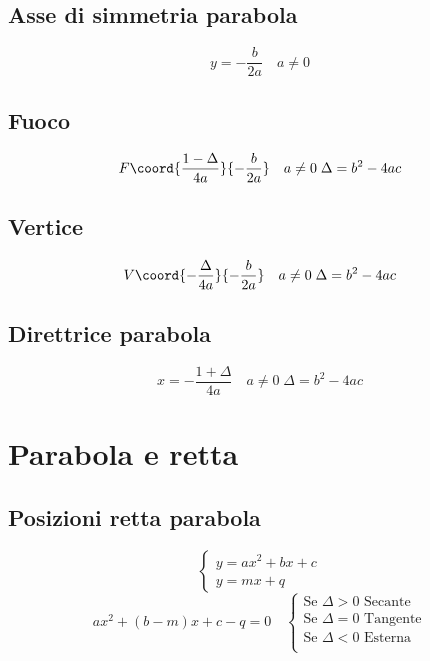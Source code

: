 \section{Asse di simmetria parabola}
\begin{equation}
y=-\dfrac{b}{2a}\quad a\neq0
\end{equation}
\section{Fuoco}
\begin{equation}
F\coord{\dfrac{1-\Delta}{4a}}{-\dfrac{b}{2a}}\quad  a\neq0\; \Delta=b^2-4ac
\end{equation}
\section{Vertice}
\begin{equation}
V\coord{-\dfrac{\Delta}{4a}}{-\dfrac{b}{2a}}\quad  a\neq0\; \Delta=b^2-4ac
\end{equation}
\section{Direttrice parabola}
\begin{equation}
x=-\dfrac{1+\Delta}{4a}\quad  a\neq0\;\Delta=b^2-4ac
\end{equation}
\chapter{Parabola e retta}
\section{Posizioni retta parabola}
\begin{equation}
\begin{cases}
y=ax^2+bx+c\\
y=mx+q
\end{cases}
\end{equation}
\begin{equation}
ax^2+(b-m)x+c-q=0\quad\begin{cases}
\text{Se $\Delta >0$ Secante}\\
\text{Se $\Delta =0$ Tangente}\\
\text{Se $\Delta <0$ Esterna}\\
\end{cases}
\end{equation}

